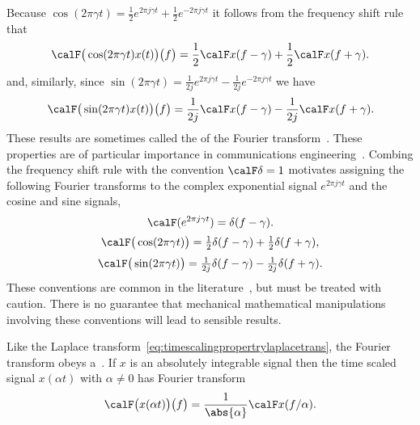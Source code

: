 
Because $\cos( 2\pi \gamma t) = \tfrac{1}{2}e^{2\pi j \gamma t} + \tfrac{1}{2}e^{-2\pi j \gamma t}$ it follows from the frequency shift rule that
\begin{equation}\label{eq:modulationpropertyft}
\calF\big( \cos(2\pi \gamma t) x(t)\big)\big( f \big) =  \frac{1}{2}\calF x(f - \gamma) + \frac{1}{2}\calF x(f + \gamma).
\end{equation}
and, similarly, since $\sin( 2\pi \gamma t) = \tfrac{1}{2j}e^{2\pi j \gamma t} - \tfrac{1}{2j}e^{-2\pi j \gamma t}$ we have
\[
 \calF\big( \sin(2\pi \gamma t) x(t)\big)\big( f \big) =  \frac{1}{2j}\calF x(f - \gamma) - \frac{1}{2j}\calF x( f + \gamma).
 \]
These results are sometimes called the  of the Fourier transform~\cite[page~61]{Papoulis_signal_analysis_1977}.  These properties are of particular importance in communications engineering~\citep{Proakis_digital_comms}.  Combing the frequency shift rule with the convention $\calF \delta = 1$ motivates assigning the following Fourier transforms to the complex exponential signal $e^{2\pi j \gamma t}$ and the cosine and sine signals,
\[
 \calF(e^{2\pi j  \gamma t}) = \delta(f - \gamma).
 \]
\[
\calF\big( \cos(2\pi \gamma t) \big) = \tfrac{1}{2} \delta(f - \gamma) + \tfrac{1}{2} \delta(f + \gamma),
\]
\[
\calF\big( \sin(2\pi \gamma t) \big) = \tfrac{1}{2j} \delta(f - \gamma) - \tfrac{1}{2j} \delta(f + \gamma).
\]
These conventions are common in the literature~\citep{Oppenheiim_sigs_sys_1996,Proakis_digital_comms}, but must be treated with caution.  There is no guarantee that mechanical mathematical manipulations involving these conventions will lead to sensible results.

Like the Laplace transform~\eqref{eq:timescalingpropertrylaplacetrans}, the Fourier transform obeys a~.  If $x$ is an absolutely integrable signal then the time scaled signal $x(\alpha t)$ with $\alpha \neq 0$ has Fourier transform
\begin{equation}\label{eq:timescalingpropertryfouriertrans}
\calF\big( x(\alpha t)\big)\big( f \big) = \frac{1}{\abs{\alpha}} \calF x (f/\alpha).
\end{equation}



